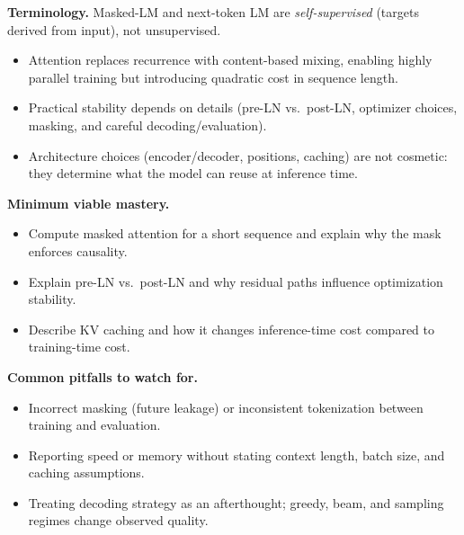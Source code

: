 \begin{tcolorbox}[summarybox, breakable, title={Key takeaways}]
\noindent\textbf{Terminology.} Masked-LM and next-token LM are \emph{self-supervised} (targets derived from input), not unsupervised.
\par\smallskip
\begin{itemize}
    \item Attention replaces recurrence with content-based mixing, enabling highly parallel training but introducing quadratic cost in sequence length.
    \item Practical stability depends on details (pre-LN vs.\ post-LN, optimizer choices, masking, and careful decoding/evaluation).
    \item Architecture choices (encoder/decoder, positions, caching) are not cosmetic: they determine what the model can reuse at inference time.
\end{itemize}

\medskip
\noindent\textbf{Minimum viable mastery.}
\begin{itemize}
    \item Compute masked attention for a short sequence and explain why the mask enforces causality.
    \item Explain pre-LN vs.\ post-LN and why residual paths influence optimization stability.
    \item Describe KV caching and how it changes inference-time cost compared to training-time cost.
\end{itemize}

\noindent\textbf{Common pitfalls to watch for.}
\begin{itemize}
    \item Incorrect masking (future leakage) or inconsistent tokenization between training and evaluation.
    \item Reporting speed or memory without stating context length, batch size, and caching assumptions.
    \item Treating decoding strategy as an afterthought; greedy, beam, and sampling regimes change observed quality.
\end{itemize}
\end{tcolorbox}

